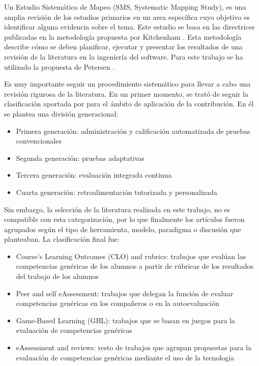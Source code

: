 
Un Estudio Sistemático de Mapeo (SMS, Systematic Mapping Study), es una amplia revisión de los estudios primarios en un area específica cuyo objetivo es identificar alguna evidencia sobre el tema. Este estudio se basa en las directrices publicadas en la metodología propuesta por Kitchenham \cite{Kitchenham:2010}. Esta metodología describe cómo se deben planificar, ejecutar y presentar los resultados de una revisión de la literatura en la ingeniería del software. Para este trabajo se ha utilizado la propuesta de Petersen \cite{Petersen:2008}.

Es muy importante seguir un procedimiento sistemático para llevar a cabo una revisión rigurosa de la literatura. En un primer momento, se trató de seguir la clasificación aportada por \cite{Redecker:2012} para el ámbito de aplicación de la contribución. En él se plantea una división generacional:
\begin{itemize}
\item Primera generación: administración y calificación automatizada de pruebas convencionales
\item Segunda generación: pruebas adaptativas
\item Tercera generación: evaluación integrada continua
\item Cuarta generación: retroalimentación tutorizada y personalizada
\end{itemize}
Sin embargo, la selección de la literatura realizada en este trabajo, no es compatible con esta categorización, por lo que finalmente los artículos fueron agrupados según el tipo de herramienta, modelo, paradigma o discusión que planteaban. La clasificación final fue:
\begin{itemize}
\item Course’s Learning Outcomes (CLO) and rubrics: trabajos que evalúan las competencias genéricas de los alumnos a partir de rúbricas de los resultados del trabajo de los alumnos
\item Peer and self eAssessment: trabajos que delegan la función de evaluar competencias genéricas en los compañeros o en la autoevaluación
\item Game-Based Learning (GBL): trabajos que se basan en juegos para la evaluación de competencias genéricas
\item eAssessment and reviews: resto de trabajos que agrupan propuestas para la evaluación de competencias genéricas mediante el uso de la tecnología 
\end{itemize}

